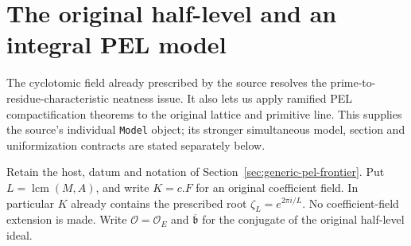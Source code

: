 \section{The original half-level and an integral PEL model}
\label{sec:integral-pel-frontier}

The cyclotomic field already prescribed by the source resolves the
prime-to-residue-characteristic neatness issue.  It also lets us apply
ramified PEL compactification theorems to the original lattice and
primitive line.  This supplies the source's individual \texttt{Model}
object; its stronger simultaneous model, section and uniformization
contracts are stated separately below.

Retain the host, datum and notation of
Section~\ref{sec:generic-pel-frontier}.  Put $L=\operatorname{lcm}(M,A)$,
and write $K=c.F$ for an original coefficient field.  In particular
$K$ already contains the prescribed root
$\zeta_L=e^{2\pi i/L}$.  No coefficient-field extension is made.
Write $\mathcal O=\mathcal O_E$ and $\overline{\mathfrak b}$ for the
conjugate of the original half-level ideal.

